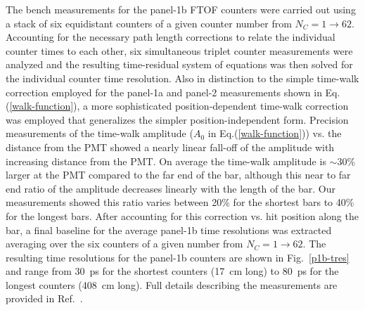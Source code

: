\documentclass[final,3p,twocolumn]{elsarticle}
\begin{document}
The bench measurements for the panel-1b FTOF counters were carried out using a stack of six
equidistant counters of a given counter number from $N_C = 1 \to 62$. Accounting for the
necessary path length corrections to relate the individual counter times to each other, six simultaneous
triplet counter measurements were analyzed and the resulting time-residual system of equations was then
solved for the individual counter time resolution. Also in distinction to the simple time-walk correction
employed for the panel-1a and panel-2 measurements shown in Eq.(\ref{walk-function}), a more sophisticated
position-dependent time-walk correction was employed that generalizes the simpler position-independent form.
Precision measurements of the time-walk amplitude ($A_0$ in Eq.(\ref{walk-function})) vs. the distance from
the PMT showed a nearly linear fall-off of the amplitude with increasing distance from the PMT. On average
the time-walk amplitude is $\sim$30\% larger at the PMT compared to the far end of the bar, although this
near to far end ratio of the amplitude decreases linearly with the length of the bar. Our measurements
showed this ratio varies between 20\% for the shortest bars to 40\% for the longest bars. After accounting
for this correction vs. hit position along the bar, a final baseline for the average panel-1b time resolutions was
extracted averaging over the six counters of a given number from $N_C = 1 \to 62$. The resulting time
resolutions for the panel-1b counters are shown in Fig.~\ref{p1b-tres} and range from 30~ps for the shortest
counters  (17~cm long) to 80~ps for the longest counters (408~cm long). Full details describing the
measurements are provided in Ref.~\cite{nim-p1b}.
\end{document}
